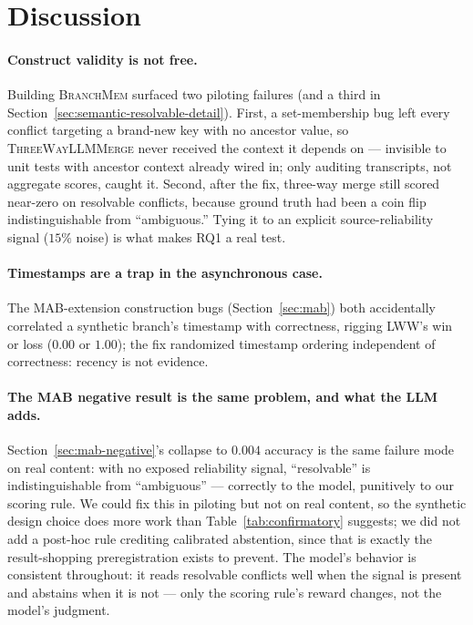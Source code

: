 \documentclass[11pt]{article}
\begin{document}
\section{Discussion}
\label{sec:discussion}

\paragraph{Construct validity is not free.} Building \textsc{BranchMem}
surfaced two piloting failures (and a third in Section~\ref{sec:semantic-resolvable-detail}).
First, a set-membership bug left every conflict targeting a brand-new key
with no ancestor value, so \textsc{ThreeWayLLMMerge} never received the
context it depends on --- invisible to unit tests with ancestor context
already wired in; only auditing transcripts, not aggregate scores, caught
it. Second, after the fix, three-way merge still scored near-zero on
resolvable conflicts, because ground truth had been a coin flip
indistinguishable from ``ambiguous.'' Tying it to an explicit
source-reliability signal ($15\%$ noise) is what makes RQ1 a real test.

\paragraph{Timestamps are a trap in the asynchronous case.} The
MAB-extension construction bugs (Section~\ref{sec:mab}) both accidentally
correlated a synthetic branch's timestamp with correctness, rigging LWW's
win or loss ($0.00$ or $1.00$); the fix randomized timestamp ordering
independent of correctness: recency is not evidence.

\paragraph{The MAB negative result is the same problem, and what the LLM
adds.} Section~\ref{sec:mab-negative}'s collapse to $0.004$ accuracy is the
same failure mode on real content: with no exposed reliability signal,
``resolvable'' is indistinguishable from ``ambiguous'' --- correctly to the
model, punitively to our scoring rule. We could fix this in piloting but
not on real content, so the synthetic design choice does more work than
Table~\ref{tab:confirmatory} suggests; we did not add a post-hoc rule
crediting calibrated abstention, since that is exactly the result-shopping
preregistration exists to prevent. The model's behavior is consistent
throughout: it reads resolvable conflicts well when the signal is present
and abstains when it is not --- only the scoring rule's reward changes, not
the model's judgment.
\end{document}
